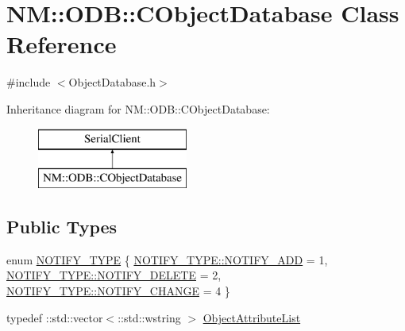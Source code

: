 \hypertarget{class_n_m_1_1_o_d_b_1_1_c_object_database}{}\section{N\+M\+:\+:O\+D\+B\+:\+:C\+Object\+Database Class Reference}
\label{class_n_m_1_1_o_d_b_1_1_c_object_database}


{\ttfamily \#include $<$Object\+Database.\+h$>$}

Inheritance diagram for N\+M\+:\+:O\+D\+B\+:\+:C\+Object\+Database\+:\begin{figure}[H]
\begin{center}
\leavevmode
\includegraphics[height=2.000000cm]{class_n_m_1_1_o_d_b_1_1_c_object_database}
\end{center}
\end{figure}
\subsection*{Public Types}
\begin{DoxyCompactItemize}
\item 
enum \hyperlink{class_n_m_1_1_o_d_b_1_1_c_object_database_a706b0a517469d7c4ddf2a8a7730219de}{N\+O\+T\+I\+F\+Y\+\_\+\+T\+Y\+P\+E} \{ \hyperlink{class_n_m_1_1_o_d_b_1_1_c_object_database_a706b0a517469d7c4ddf2a8a7730219dead32c7592a66e6e96f15b43c9d9f13846}{N\+O\+T\+I\+F\+Y\+\_\+\+T\+Y\+P\+E\+::\+N\+O\+T\+I\+F\+Y\+\_\+\+A\+D\+D} = 1, 
\hyperlink{class_n_m_1_1_o_d_b_1_1_c_object_database_a706b0a517469d7c4ddf2a8a7730219dea3d2b0ba9bc47406c9c5abeccfcdba46e}{N\+O\+T\+I\+F\+Y\+\_\+\+T\+Y\+P\+E\+::\+N\+O\+T\+I\+F\+Y\+\_\+\+D\+E\+L\+E\+T\+E} = 2, 
\hyperlink{class_n_m_1_1_o_d_b_1_1_c_object_database_a706b0a517469d7c4ddf2a8a7730219deaa9649df4997d00fcfd6e3747944bcff7}{N\+O\+T\+I\+F\+Y\+\_\+\+T\+Y\+P\+E\+::\+N\+O\+T\+I\+F\+Y\+\_\+\+C\+H\+A\+N\+G\+E} = 4
 \}
\item 
typedef \+::std\+::vector$<$\+::std\+::wstring $>$ \hyperlink{class_n_m_1_1_o_d_b_1_1_c_object_database_af71c35cd26a6e83732da7ae538c665a0}{Object\+Attribute\+List}
\end{DoxyCompactItemize}
